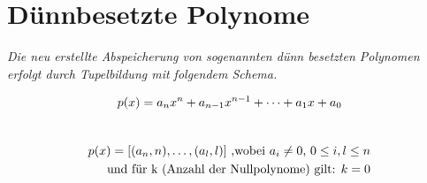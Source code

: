 										
\newcommand{\dozent}{Wolfgang Mulzer, Katharina Klost}					%
\newcommand{\tutor}{Tobias Gleißner}						%
\newcommand{\tutoriumNo}{02}				%
\newcommand{\ubungNo}{02}									%
\newcommand{\veranstaltung}{Algorithmen, Datenstrukturen und Datenabstraktion}	%
\newcommand{\semester}{Semester}						%
\newcommand{\studenten}{Nicolas Höcker, Michael Wernitz}			%
\newcommand{\aufgNo}{3}	

\usepackage{amsmath}
\usepackage{mathtools}
\usepackage{letltxmacro}
\usepackage{graphicx}
\usepackage{listings}
\usepackage{color}
							


\section{ Dünnbesetzte Polynome \hfill}
{\itshape Die neu erstellte Abspeicherung von sogenannten dünn besetzten Polynomen erfolgt durch Tupelbildung mit folgendem Schema. }

\begin{equation}
	\begin{aligned}
		p(x) = a_nx^n + a_{n-1}x^{n-1} + \dots + a_1x + a_0 \notag\\
	\end{aligned} 
\end{equation}
		 \\
\begin{equation}
	\begin{aligned}
		p(x) = [(a_{n},n), \dots , (a_l,l)] \text{ ,wobei } a_i \neq 0 \text{, } 0 \leq i,l \leq n \notag \\ 
		\text{ und für k (Anzahl der Nullpolynome) gilt: } k=0 \\		
	\end{aligned}
\end{equation}		


